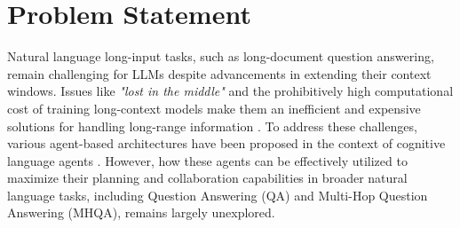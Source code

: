 \section{Problem Statement}
\label{sec:problemStatement}

Natural language long-input tasks, such as long-document question answering, remain challenging for LLMs despite advancements in extending their context windows. Issues like \textit{"lost in the middle"} and the prohibitively high computational cost of training long-context models make them an inefficient and expensive solutions for handling long-range information \cite{liu2023lostmiddlelanguagemodels}\cite{kitaev2020reformerefficienttransformer}. To address these challenges, various agent-based architectures have been proposed in the context of cognitive language agents \cite{sumers2024cognitive}\cite{packer2024memgptllmsoperatingsystems}\cite{li2024graphreaderbuildinggraphbasedagent}\cite{anokhin2024arigraphlearningknowledgegraph}\cite{zhao-etal-2024-longagent}. However, how these agents can be effectively utilized to maximize their planning and collaboration capabilities in broader natural language tasks, including Question Answering (QA) and Multi-Hop Question Answering (MHQA), remains largely unexplored.
